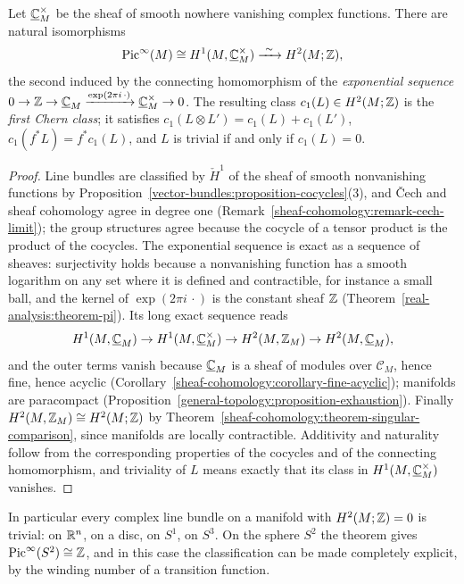 \begin{theorem}\label{vector-bundles:theorem-line-bundles}
Let $\underline{\mathbb{C}}^\times_M$ be the sheaf of smooth nowhere vanishing complex functions. There are natural isomorphisms
\[
\operatorname{Pic}^\infty(M) \cong H^1(M, \underline{\mathbb{C}}^\times_M) \xrightarrow{\ \sim\ } H^2(M; \mathbb{Z}),
\]
the second induced by the connecting homomorphism of the \emph{exponential sequence}
$0 \to \mathbb{Z} \to \underline{\mathbb{C}}_M \xrightarrow{\exp(2\pi i\,\cdot)} \underline{\mathbb{C}}^\times_M \to 0$. The resulting class $c_1(L) \in H^2(M; \mathbb{Z})$ is the \emph{first Chern class}; it satisfies
$c_1(L \otimes L') = c_1(L) + c_1(L')$, $c_1(f^*L) = f^*c_1(L)$, and $L$ is trivial if and only if $c_1(L) = 0$.
\end{theorem}

\begin{proof}
Line bundles are classified by $\check{H}^1$ of the sheaf of smooth nonvanishing functions by Proposition~\ref{vector-bundles:proposition-cocycles}(3), and \v{C}ech and sheaf cohomology agree in degree one
(Remark~\ref{sheaf-cohomology:remark-cech-limit}); the group structures agree because the cocycle of a tensor product is the product of the cocycles. The exponential sequence is exact as a sequence of
sheaves: surjectivity holds because a nonvanishing function has a smooth logarithm on any set where it is defined and contractible, for instance a small ball, and the kernel of $\exp(2\pi i\,\cdot)$ is the
constant sheaf $\mathbb{Z}$ (Theorem~\ref{real-analysis:theorem-pi}). Its long exact sequence reads
\[
H^1(M, \underline{\mathbb{C}}_M) \to H^1(M, \underline{\mathbb{C}}^\times_M) \to H^2(M, \mathbb{Z}_M) \to H^2(M, \underline{\mathbb{C}}_M),
\]
and the outer terms vanish because $\underline{\mathbb{C}}_M$ is a sheaf of modules over $\mathcal{C}_M$, hence fine, hence acyclic (Corollary~\ref{sheaf-cohomology:corollary-fine-acyclic}); manifolds are
paracompact (Proposition~\ref{general-topology:proposition-exhaustion}). Finally $H^2(M, \mathbb{Z}_M) \cong H^2(M; \mathbb{Z})$ by Theorem~\ref{sheaf-cohomology:theorem-singular-comparison}, since manifolds are locally
contractible. Additivity and naturality follow from the corresponding properties of the cocycles and of the connecting homomorphism, and triviality of $L$ means exactly that its class in
$H^1(M, \underline{\mathbb{C}}^\times_M)$ vanishes.
\end{proof}

In particular every complex line bundle on a manifold with $H^2(M; \mathbb{Z}) = 0$ is trivial: on $\mathbb{R}^n$, on a disc, on $S^1$, on $S^3$. On the sphere $S^2$ the theorem gives
$\operatorname{Pic}^\infty(S^2) \cong \mathbb{Z}$, and in this case the classification can be made completely explicit, by the winding number of a transition function.

